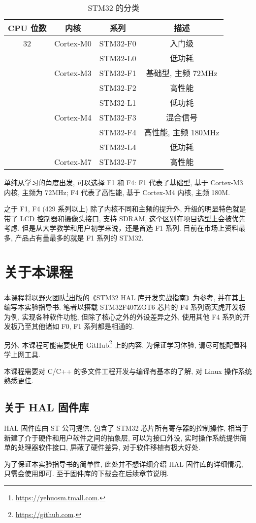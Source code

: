 \begin{table}[H]
    \centering
    \caption{STM32 的分类} \label{tab:1-intro stm32 class}
    \begin{tabular}{cccc}\toprule
        \textbf{CPU 位数} & \textbf{内核} & \textbf{系列} & \textbf{描述}    \\\midrule
        32              & Cortex-M0   & STM32-F0    & 入门级            \\
                        &             & STM32-L0    & 低功耗            \\
                        & Cortex-M3   & STM32-F1    & 基础型, 主频 72MHz  \\
                        &             & STM32-F2    & 高性能            \\
                        &             & STM32-L1    & 低功耗            \\
                        & Cortex-M4   & STM32-F3    & 混合信号           \\
                        &             & STM32-F4    & 高性能, 主频 180MHz \\
                        &             & STM32-L4    & 低功耗            \\
                        & Cortex-M7   & STM32-F7    & 高性能            \\
        \bottomrule
    \end{tabular}
\end{table}

单纯从学习的角度出发, 可以选择 F1 和 F4: F1 代表了基础型, 基于 Cortex-M3 内核, 主频为 72MHz; F4 代表了高性能, 基于 Cortex-M4 内核, 主频 180M.

之于 F1, F4 (429 系列以上) 除了内核不同和主频的提升外, 升级的明显特色就是带了 LCD 控制器和摄像头接口, 支持 SDRAM, 这个区别在项目选型上会被优先考虑. 但是从大学教学和用户初学来说，还是首选 F1 系列. 目前在市场上资料最多, 产品占有量最多的就是 F1 系列的 STM32.

\section{关于本课程}
本课程将以野火团队\footnote{\url{https://yehuosm.tmall.com}.}出版的《STM32 HAL 库开发实战指南》为参考, 并在其上编写本实验指导书. 笔者以搭载 STM32F407ZGT6 芯片的 F4 系列霸天虎开发板为例, 实现各种软件功能, 但除了核心之外的外设差异之外, 使用其他 F4 系列的开发板乃至其他诸如 F0, F1 系列都是相通的.

另外, 本课程可能需要使用 GitHub\footnote{\url{https://github.com}.} 上的内容. 为保证学习体验, 请尽可能配置科学上网工具.

本课程需要对 C/C++ 的多文件工程开发与编译有基本的了解, 对 Linux 操作系统熟悉更佳.

\subsection{关于 HAL 固件库}
HAL 固件库由 ST 公司提供, 包含了 STM32 芯片所有寄存器的控制操作, 相当于新建了介于硬件和用户软件之间的抽象层, 可以为接口外设, 实时操作系统提供简单的处理器软件接口, 屏蔽了硬件差异, 对于软件移植有极大好处.

为了保证本实验指导书的简单性, 此处并不想详细介绍 HAL 固件库的详细情况, 只需会使用即可. 至于固件库的下载会在后续章节说明.
